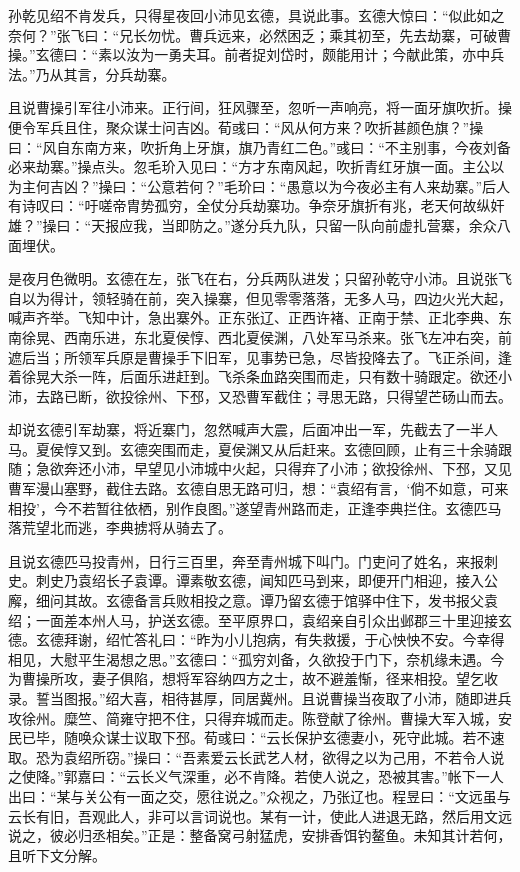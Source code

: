 孙乾见绍不肯发兵，只得星夜回小沛见玄德，具说此事。玄德大惊曰：“似此如之奈何？”张飞曰：“兄长勿忧。曹兵远来，必然困乏；乘其初至，先去劫寨，可破曹操。”玄德曰：“素以汝为一勇夫耳。前者捉刘岱时，颇能用计；今献此策，亦中兵法。”乃从其言，分兵劫寨。

且说曹操引军往小沛来。正行间，狂风骤至，忽听一声响亮，将一面牙旗吹折。操便令军兵且住，聚众谋士问吉凶。荀彧曰：“风从何方来？吹折甚颜色旗？”操曰：“风自东南方来，吹折角上牙旗，旗乃青红二色。”彧曰：“不主别事，今夜刘备必来劫寨。”操点头。忽毛玠入见曰：“方才东南风起，吹折青红牙旗一面。主公以为主何吉凶？”操曰：“公意若何？”毛玠曰：“愚意以为今夜必主有人来劫寨。”后人有诗叹曰：“吁嗟帝胄势孤穷，全仗分兵劫寨功。争奈牙旗折有兆，老天何故纵奸雄？”操曰：“天报应我，当即防之。”遂分兵九队，只留一队向前虚扎营寨，余众八面埋伏。

是夜月色微明。玄德在左，张飞在右，分兵两队进发；只留孙乾守小沛。且说张飞自以为得计，领轻骑在前，突入操寨，但见零零落落，无多人马，四边火光大起，喊声齐举。飞知中计，急出寨外。正东张辽、正西许褚、正南于禁、正北李典、东南徐晃、西南乐进，东北夏侯惇、西北夏侯渊，八处军马杀来。张飞左冲右突，前遮后当；所领军兵原是曹操手下旧军，见事势已急，尽皆投降去了。飞正杀间，逢着徐晃大杀一阵，后面乐进赶到。飞杀条血路突围而走，只有数十骑跟定。欲还小沛，去路已断，欲投徐州、下邳，又恐曹军截住；寻思无路，只得望芒砀山而去。

却说玄德引军劫寨，将近寨门，忽然喊声大震，后面冲出一军，先截去了一半人马。夏侯惇又到。玄德突围而走，夏侯渊又从后赶来。玄德回顾，止有三十余骑跟随；急欲奔还小沛，早望见小沛城中火起，只得弃了小沛；欲投徐州、下邳，又见曹军漫山塞野，截住去路。玄德自思无路可归，想：“袁绍有言，‘倘不如意，可来相投’，今不若暂往依栖，别作良图。”遂望青州路而走，正逢李典拦住。玄德匹马落荒望北而逃，李典掳将从骑去了。

且说玄德匹马投青州，日行三百里，奔至青州城下叫门。门吏问了姓名，来报刺史。刺史乃袁绍长子袁谭。谭素敬玄德，闻知匹马到来，即便开门相迎，接入公廨，细问其故。玄德备言兵败相投之意。谭乃留玄德于馆驿中住下，发书报父袁绍；一面差本州人马，护送玄德。至平原界口，袁绍亲自引众出邺郡三十里迎接玄德。玄德拜谢，绍忙答礼曰：“昨为小儿抱病，有失救援，于心怏怏不安。今幸得相见，大慰平生渴想之思。”玄德曰：“孤穷刘备，久欲投于门下，奈机缘未遇。今为曹操所攻，妻子俱陷，想将军容纳四方之士，故不避羞惭，径来相投。望乞收录。誓当图报。”绍大喜，相待甚厚，同居冀州。且说曹操当夜取了小沛，随即进兵攻徐州。糜竺、简雍守把不住，只得弃城而走。陈登献了徐州。曹操大军入城，安民已毕，随唤众谋士议取下邳。荀彧曰：“云长保护玄德妻小，死守此城。若不速取。恐为袁绍所窃。”操曰：“吾素爱云长武艺人材，欲得之以为己用，不若令人说之使降。”郭嘉曰：“云长义气深重，必不肯降。若使人说之，恐被其害。”帐下一人出曰：“某与关公有一面之交，愿往说之。”众视之，乃张辽也。程昱曰：“文远虽与云长有旧，吾观此人，非可以言词说也。某有一计，使此人进退无路，然后用文远说之，彼必归丞相矣。”正是：整备窝弓射猛虎，安排香饵钓鳌鱼。未知其计若何，且听下文分解。